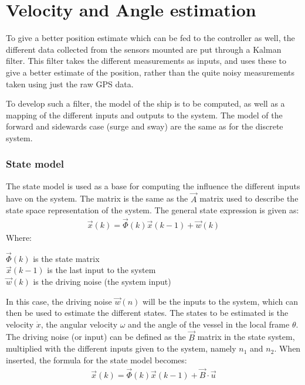 \chapter{Velocity and Angle estimation}
To give a better position estimate which can be fed to the controller as well, the different data collected from the sensors mounted are put through a Kalman filter. This filter takes the different measurements as inputs, and uses these to give a better estimate of the position, rather than the quite noisy measurements taken using just the raw \ac{GPS} data. 

To develop such a filter, the model of the ship is to be computed, as well as a mapping of the different inputs and outputs to the system. The model of the forward and sidewards case (surge and sway) are the same as for the discrete system. 

\subsection{State model}
The state model is used as a base for computing the influence the different inputs have on the system. The matrix is the same as the $\vec{A}$ matrix used to describe the state space representation of the system. The general state expression is given as:
\begin{align}
\vec{x}(k) = \vec{\Phi}(k)\vec{x}(k-1) + \vec{w}(k)
\end{align}
\noindent Where:
\begin{ffk}
$\vec{\Phi}(k)$ is the state matrix\\
$\vec{x}(k-1)$ is the last input to the system\\
$\vec{w}(k)$ is the driving noise (the system input)
\end{ffk}
In this case, the driving noise $\vec{w}(n)$ will be the inputs to the system, which can then be used to estimate the different states. The states to be estimated is the velocity $\dot{x}$, the angular velocity $\omega$ and the angle of the vessel in the local frame $\theta$. The driving noise (or input) can be defined as the $\vec{B}$ matrix in the state system, multiplied with the different inputs given to the system, namely $n_1$ and $n_2$. When inserted, the formula for the state model becomes:
\begin{align}
\vec{x}(k) = \vec{\Phi}(k)\vec{x}(k-1) + \vec{B}\cdot\vec{u}
\end{align}

